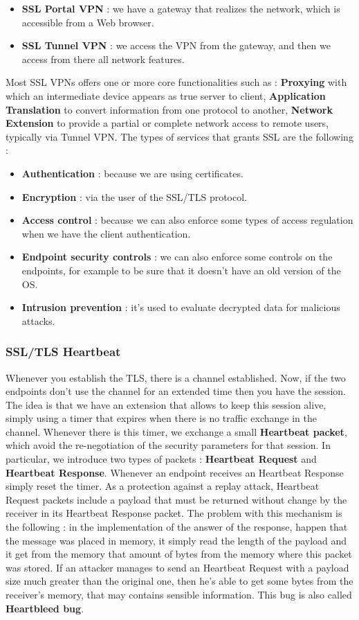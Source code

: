 \documentclass[11pt]{article}
\begin{document}
\begin{itemize}
\item \textbf{SSL Portal VPN} : we have a gateway that realizes the network, which is accessible from a Web browser.
\item \textbf{SSL Tunnel VPN} : we access the VPN from the gateway, and then we access from there all network features.
\end{itemize} 
Most SSL VPNs offers one or more core functionalities such as : \textbf{Proxying} with which an intermediate device appears as true server to client, \textbf{Application Translation} to convert information from one protocol to another, \textbf{Network Extension} to provide a partial or complete network access to remote users, typically via Tunnel VPN. The types of services that grants SSL are the following :
\begin{itemize}
\item \textbf{Authentication} : because we are using certificates.
\item \textbf{Encryption} : via the user of the SSL/TLS protocol.
\item \textbf{Access control} : because we can also enforce some types of access regulation when we have the client authentication.
\item \textbf{Endpoint security controls} : we can also enforce some controls on the endpoints, for example to be sure that it doesn't have an old version of the OS.
\item \textbf{Intrusion prevention} : it's used to evaluate decrypted data for malicious attacks. 
\end{itemize}
\subsubsection{SSL/TLS Heartbeat}
Whenever you establish the TLS, there is a channel established. Now, if the two endpoints don't use the channel for an extended time then you have the session. The idea is that we have an extension that allows to keep this session alive, simply using a timer that expires when there is no traffic exchange in the channel. Whenever there is this timer, we exchange a small \textbf{Heartbeat packet}, which avoid the re-negotiation of the security parameters for that session. In particular, we introduce two types of packets : \textbf{Heartbeat Request} and \textbf{Heartbeat Response}. Whenever an endpoint receives an Heartbeat Response simply reset the timer. As a protection against a replay attack, Heartbeat Request packets include a payload that must be returned without change by the receiver in its Heartbeat Response packet.  The problem with this mechanism is the following : in the implementation of the answer of the response, happen that the message was placed in memory, it simply read the length of the payload and it get from the memory that amount of bytes from the memory where this packet was stored. If an attacker manages to send an Heartbeat Request with a payload size much greater than the original one, then he's able to get some bytes from the receiver's memory, that may contains sensible information. This bug is also called \textbf{Heartbleed bug}.
\end{document}
